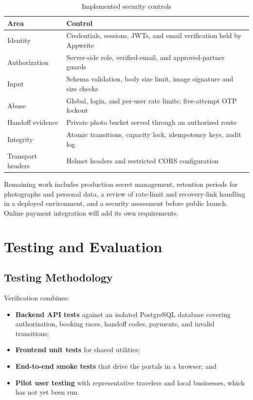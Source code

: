\documentclass{tietreport}
\begin{document}
\begin{table}[H]
\centering
\begin{tabular}{P{0.28\textwidth}P{0.62\textwidth}}
\toprule
\textbf{Area} & \textbf{Control} \\
\midrule
Identity & Credentials, sessions, JWTs, and email verification held by Appwrite \\
Authorization & Server-side role, verified-email, and approved-partner guards \\
Input & Schema validation, body size limit, image signature and size checks \\
Abuse & Global, login, and per-user rate limits; five-attempt OTP lockout \\
Handoff evidence & Private photo bucket served through an authorized route \\
Integrity & Atomic transitions, capacity lock, idempotency keys, audit log \\
Transport headers & Helmet headers and restricted CORS configuration \\
\bottomrule
\end{tabular}
\caption{Implemented security controls}
\label{tab:security}
\end{table}

Remaining work includes production secret management, retention periods for photographs and personal data, a review of rate-limit and recovery-link handling in a deployed environment, and a security assessment before public launch. Online payment integration will add its own requirements.

\chapter{Testing and Evaluation}

\section{Testing Methodology}
Verification combines:
\begin{itemize}[leftmargin=*]
  \item \textbf{Backend API tests} against an isolated PostgreSQL database covering authorization, booking races, handoff codes, payments, and invalid transitions;
  \item \textbf{Frontend unit tests} for shared utilities;
  \item \textbf{End-to-end smoke tests} that drive the portals in a browser; and
  \item \textbf{Pilot user testing} with representative travelers and local businesses, which has not yet been run.
\end{itemize}
\end{document}
